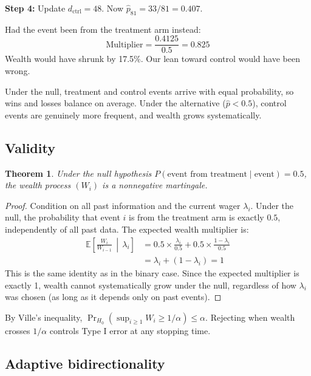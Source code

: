 \documentclass[10pt]{article}
\newtheorem{theorem}{Theorem}
\begin{document}
\textbf{Step 4:} Update $d_{\text{ctrl}} = 48$. Now $\hat{p}_{81} = 33/81 = 0.407$.

Had the event been from the treatment arm instead:
\begin{equation}
\text{Multiplier} = \frac{0.4125}{0.5} = 0.825
\end{equation}
Wealth would have shrunk by 17.5\%. Our lean toward control would have been wrong.

Under the null, treatment and control events arrive with equal probability, so wins and losses balance on average. Under the alternative ($\hat{p} < 0.5$), control events are genuinely more frequent, and wealth grows systematically.

\subsection{Validity}

\begin{theorem}
Under the null hypothesis $P(\text{event from treatment} \mid \text{event}) = 0.5$, the wealth process $(W_i)$ is a nonnegative martingale.
\end{theorem}

\begin{proof}
Condition on all past information and the current wager $\lambda_i$. Under the null, the probability that event $i$ is from the treatment arm is exactly $0.5$, independently of all past data. The expected wealth multiplier is:
\begin{align}
\mathbb{E}\left[\frac{W_i}{W_{i-1}} \,\middle|\, \lambda_i\right] &= 0.5 \times \frac{\lambda_i}{0.5} + 0.5 \times \frac{1 - \lambda_i}{0.5} \\
&= \lambda_i + (1 - \lambda_i) = 1
\end{align}
This is the same identity as in the binary case. Since the expected multiplier is exactly 1, wealth cannot systematically grow under the null, regardless of how $\lambda_i$ was chosen (as long as it depends only on past events).
\end{proof}

By Ville's inequality, $\Pr_{H_0}(\sup_{i \geq 1} W_i \geq 1/\alpha) \leq \alpha$. Rejecting when wealth crosses $1/\alpha$ controls Type I error at any stopping time.

\subsection{Adaptive bidirectionality}
\end{document}
